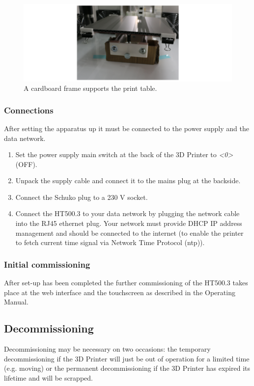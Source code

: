 \begin{figure}[H]
  \centering
  \includegraphics[width=.7\linewidth]{./img/secure_table.png}
  \caption{A cardboard frame supports the print table.}
\end{figure}


\subsubsection{Connections}

After setting the apparatus up it must be connected to the power supply and the data network.

\begin{enumerate}
  \item Set the power supply main switch at the back of the 3D Printer to \emph{<0>} (OFF).
  \item Unpack the supply cable and connect it to the mains plug at the backside.
  \item Connect the Schuko plug to a 230 V socket.
  \item Connect the HT500.3 to your data network by plugging the network cable into the RJ45 ethernet plug. 
        Your network must provide DHCP IP address management and should be connected to the internet (to enable the printer to fetch current time signal via Network Time Protocol (ntp)).
\end{enumerate}

\subsubsection{Initial commissioning}

After set-up has been completed the further commissioning of the HT500.3 takes place at the web interface and the touchscreen as described in the Operating Manual. 

\subsection{Decommissioning}

Decommissioning may be necessary on two occasions: the temporary decommissioning if the 3D Printer will just be out of operation for a limited time (e.g. moving) or the permanent decommissioning if the 3D Printer has expired its lifetime and will be scrapped.



